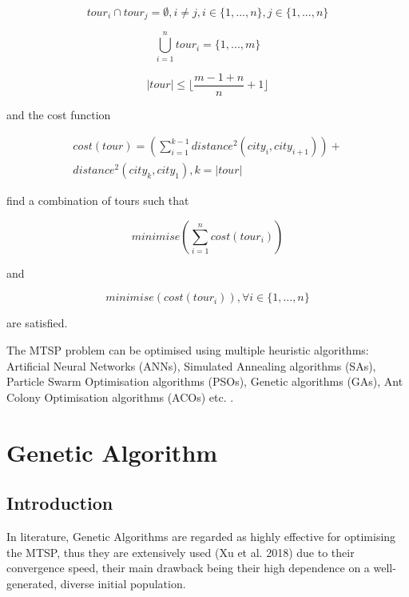 \documentclass[conference]{IEEEtran}
\begin{document}
\begin{equation}
    tour_i \cap tour_j = \emptyset, i \ne j, i \in \{1, ..., n\}, j \in \{1, ..., n\}
\end{equation}

\begin{equation}
    \bigcup_{i = 1}^{n} tour_i = \{1, ..., m\}
\end{equation}

\begin{equation} \label{tour maximum length}
    |tour| \leq \lfloor \frac{m - 1 + n}{n} + 1 \rfloor
\end{equation}

and the cost function

\begin{multline} \label{cost function}
    cost(tour) = (\sum_{i = 1}^{k - 1} distance^2(city_{i}, city_{i+1})) + \\
    distance^2(city_k, city_1), k = |tour|
\end{multline}


find a combination of tours such that

\begin{equation}
    minimise(\sum_{i = 1}^{n} cost(tour_i))
\end{equation}

and

\begin{equation}
    minimise(cost(tour_i)), \forall i \in \{1, ..., n\}
\end{equation}

are satisfied.

The MTSP problem can be optimised using multiple heuristic algorithms: Artificial Neural Networks (ANNs), Simulated
Annealing algorithms (SAs), Particle Swarm Optimisation algorithms (PSOs), Genetic algorithms (GAs), Ant Colony Optimisation
algorithms (ACOs) etc. \cite{b4}.


\section{Genetic Algorithm}

\subsection{Introduction}
In literature, Genetic Algorithms are regarded as highly effective for optimising the MTSP, thus they are extensively used (Xu
et al. 2018) due to their convergence speed, their main drawback being their high dependence on a well-generated, diverse initial
population.
\end{document}
